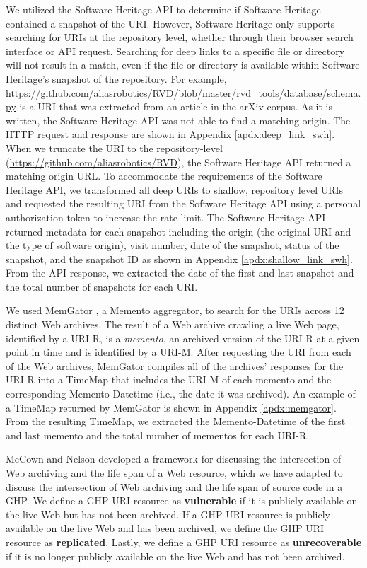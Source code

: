 We utilized the Software Heritage API \cite{swh-api} to determine if Software Heritage contained a snapshot of the URI. However, Software Heritage only supports searching for URIs at the repository level, whether through their browser search interface or API request. Searching for deep links to a specific file or directory will not result in a match, even if the file or directory is available within Software Heritage's snapshot of the repository. For example, \url{https://github.com/aliasrobotics/RVD/blob/master/rvd\_tools/database/schema.py} is a URI that was extracted from an article in the arXiv corpus. As it is written, the Software Heritage API was not able to find a matching origin. The HTTP request and response are shown in Appendix \ref{apdx:deep_link_swh}. When we truncate the URI to the repository-level (\url{https://github.com/aliasrobotics/RVD}), the Software Heritage API returned a matching origin URL. To accommodate the requirements of the Software Heritage API, we transformed all deep URIs to shallow, repository level URIs and requested the resulting URI from the Software Heritage API using a personal authorization token to increase the rate limit. The Software Heritage API returned metadata for each snapshot including the origin (the original URI and the type of software origin), visit number, date of the snapshot, status of the snapshot, and the snapshot ID \cite{dicosmo-ipres2017} as shown in Appendix \ref{apdx:shallow_link_swh}. From the API response, we extracted the date of the first and last snapshot and the total number of snapshots for each URI. 

We used MemGator \cite{jcdl-alam-memgator}, a Memento \cite{RFC7089} aggregator, to search for the URIs across 12 distinct Web archives. The result of a Web archive crawling a live Web page, identified by a URI-R, is a \emph{memento}, an archived version of the URI-R at a given point in time and is identified by a URI-M. After requesting the URI from each of the Web archives, MemGator compiles all of the archives' responses for the URI-R into a TimeMap that includes the URI-M of each memento and the corresponding Memento-Datetime (i.e., the date it was archived). An example of a TimeMap returned by MemGator is shown in Appendix \ref{apdx:memgator}. From the resulting TimeMap, we extracted the Memento-Datetime of the first and last memento and the total number of mementos for each URI-R.   

McCown and Nelson \cite{mccown-jcdl2009} developed a framework for discussing the intersection of Web archiving and the life span of a Web resource, which we have adapted to discuss the intersection of Web archiving and the life span of source code in a GHP. We define a GHP URI resource as \textbf{vulnerable} if it is publicly available on the live Web but has not been archived. If a GHP URI resource is publicly available on the live Web and has been archived, we define the GHP URI resource as \textbf{replicated}. Lastly, we define a GHP URI resource as \textbf{unrecoverable} if it is no longer publicly available on the live Web and has not been archived. 

